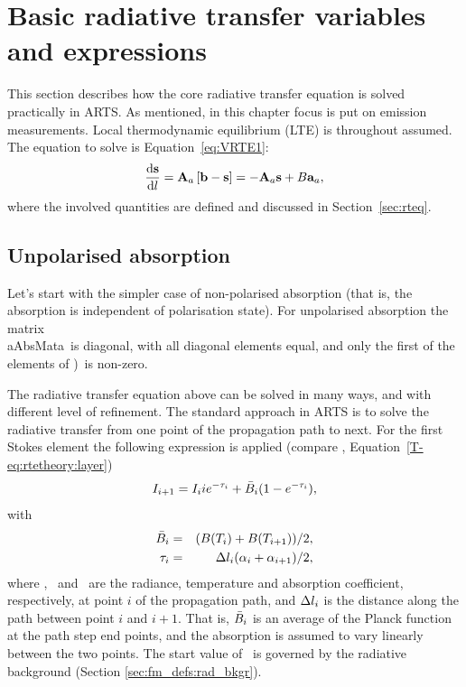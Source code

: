 \section{Basic radiative transfer variables and expressions}
\label{sec:fm_defs:rte}

This section describes how the core radiative transfer equation is solved
practically in ARTS. As mentioned, in this chapter focus is put on emission
measurements. Local thermodynamic equilibrium (LTE) is throughout assumed.
The equation to solve is Equation~\ref{eq:VRTE1}:
\begin{equation}
  \frac{\mathrm{d}{\bf s}}{\mathrm{d} l} = {\bf A}_{a}\left[ {\bf b}- {\bf s}
  \right] = -{\bf A}_{a}{\bf s} + B{\bf a}_{a},\nonumber
\end{equation}
where the involved quantities are defined and discussed in
Section~\ref{sec:rteq}.


\subsection{Unpolarised absorption}

Let's start with the simpler case of non-polarised absorption (that is, the
absorption is independent of polarisation state). For unpolarised absorption the
matrix \\aAbsMat{a}\ is diagonal, with all diagonal elements equal, and only the
first of the elements of )\ is non-zero.

The radiative transfer equation above can be solved in many ways, and with
different level of refinement. The standard approach in ARTS is to solve the
radiative transfer from one point of the propagation path to next. For the
first Stokes element the following expression is applied (compare \theory,
Equation~\ref{T-eq:rtetheory:layer})
\begin{equation}
  \label{eq:fm_defs:rte_step}
  I_{i+1} = I_{i}ie^{-\tau_{i}} + \bar{B}_i(1-e^{-\tau_{i}}),
\end{equation}
with
\begin{eqnarray}
  \bar{B}_i &=& (B(T_{i})+B(T_{i+1}))/2, \\
  \tau_{i} &=& \Delta l_{i}({\alpha}_{i}+{\alpha}_{i+1})/2,  
  \label{eq:taustep}
\end{eqnarray}
where , \ and \ are the radiance, temperature and
absorption coefficient, respectively, at point $i$ of the propagation path, and
$\Delta l_{i}$ is the distance along the path between point $i$ and
$i+1$. That is, $\bar{B}_i$ is an average of the Planck function at the
path step end points, and the absorption is assumed to vary linearly between
the two points. The start value of \StoI\ is governed by the radiative
background (Section \ref{sec:fm_defs:rad_bkgr}).


